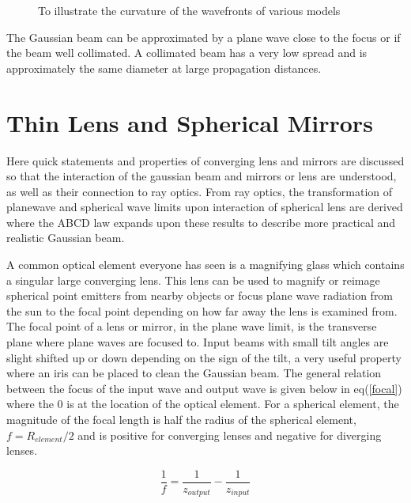 \documentclass[a4paper]{book}
\newcommand{\imginput}[1]{} %
\begin{document}
			\begin{figure} [!ht]
				\centering
				\def\svgwidth{\columnwidth}
				\resizebox{16cm}{!}{\imginput{images/wavefront.pdf_tex}}
				\caption{To illustrate the curvature of the wavefronts of various models} 
				\label{fig:wavefront}
			\end{figure}	
			
			The Gaussian beam can be approximated by a plane wave close to the focus or if the beam well collimated. 
			A collimated beam has a very low spread and is approximately the same diameter at large propagation distances. 	
			
	\section{Thin Lens and Spherical Mirrors}
		\label{sec:Thin Lens and Spherical Mirrors}
		Here quick statements and properties of converging lens and mirrors are discussed so that the interaction of the gaussian beam and mirrors or lens are understood, as well as their connection to ray optics. From ray optics, the transformation of planewave and spherical wave limits upon interaction of spherical lens are derived where the ABCD law expands upon these results to describe more practical and realistic Gaussian beam.
		
		A common optical element everyone has seen is a magnifying glass which contains a singular large converging lens. 
		This lens can be used to magnify or reimage spherical point emitters from nearby objects or focus plane wave radiation from the sun to the focal point depending on how far away the lens is examined from.
		The focal point of a lens or mirror, in the plane wave limit, is the transverse plane where plane waves are focused to. 
		Input beams with small tilt angles are slight shifted up or down depending on the sign of the tilt, a very useful property where an iris can be placed to clean the Gaussian beam. 
		The general relation between the focus of the input wave and output wave is given below in eq(\ref{focal}) where the 0 is at the location of the optical element. 
		For a spherical element, the magnitude of the focal length is half the radius of the spherical element, $f=R_{element}/2$ and is positive for converging lenses and negative for diverging lenses.
		
		\begin{equation}\label{focal}
			\frac{1}{f}=\frac{1}{z_{output}}-\frac{1}{z_{input}}
		\end{equation}
		
\end{document}
